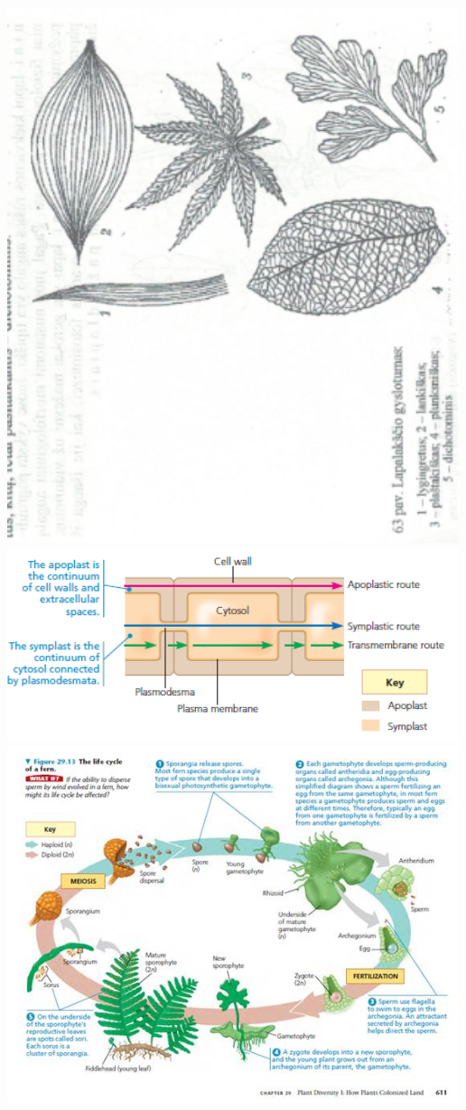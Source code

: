 \documentclass[]{book}
\begin{document}
\includegraphics[width=500px]{static/augalai/lapo_gyslotumas}
\includegraphics[width=500px]{static/augalai/medz_judejimas}
\includegraphics[width=500px]{static/augalai/papartunai}
\end{document}
